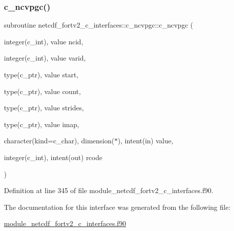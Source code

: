 \subsubsection{\texorpdfstring{c\+\_\+ncvpgc()}{c\_ncvpgc()}}
{\footnotesize\ttfamily subroutine netcdf\+\_\+fortv2\+\_\+c\+\_\+interfaces\+::c\+\_\+ncvpgc\+::c\+\_\+ncvpgc (\begin{DoxyParamCaption}\item[{integer(c\+\_\+int), value}]{ncid,  }\item[{integer(c\+\_\+int), value}]{varid,  }\item[{type(c\+\_\+ptr), value}]{start,  }\item[{type(c\+\_\+ptr), value}]{count,  }\item[{type(c\+\_\+ptr), value}]{strides,  }\item[{type(c\+\_\+ptr), value}]{imap,  }\item[{character(kind=c\+\_\+char), dimension($\ast$), intent(in)}]{value,  }\item[{integer(c\+\_\+int), intent(out)}]{rcode }\end{DoxyParamCaption})}



Definition at line 345 of file module\+\_\+netcdf\+\_\+fortv2\+\_\+c\+\_\+interfaces.\+f90.



The documentation for this interface was generated from the following file\+:\begin{DoxyCompactItemize}
\item 
\hyperlink{module__netcdf__fortv2__c__interfaces_8f90}{module\+\_\+netcdf\+\_\+fortv2\+\_\+c\+\_\+interfaces.\+f90}\end{DoxyCompactItemize}

